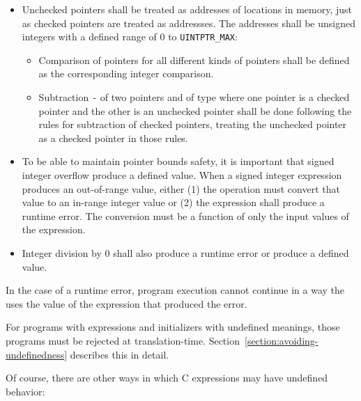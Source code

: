 \begin{itemize}
\item
  Unchecked pointers shall be treated as addresses of locations in memory,
  just as checked pointers are treated as addressses. The addresses shall
  be unsigned integers with a defined range of 0 to
  \texttt{UINTPTR\_MAX}:

  \begin{itemize}
  \item
    Comparison of pointers for all different kinds of pointers shall be
    defined as the corresponding integer comparison.
  \item
    Subtraction  \texttt{-}  of two pointers  and 
    of type  where one
    pointer is a checked pointer and the other is an unchecked pointer shall
    be done following the rules for subtraction of checked pointers,
    treating the unchecked pointer as a checked pointer in those rules.
  \end{itemize}
\end{itemize}

\begin{itemize}
\item
  To be able to maintain pointer bounds safety, it is important that
  signed integer overflow produce a defined value. When a signed integer
  expression produces an out-of-range value, either (1) the operation
  must convert that value to an in-range integer value or (2) the
  expression shall produce a runtime error. The conversion must be a
  function of only the input values of the expression.
\item
  Integer division by 0 shall also produce a runtime error or produce a
  defined value.
\end{itemize}

In the case of a runtime error, program execution cannot continue in a
way the uses the value of the expression that produced the error.

For programs with expressions and initializers with undefined meanings,
those programs must be rejected at translation-time. 
Section~\ref{section:avoiding-undefinedness}
describes this in detail.

Of course, there are other ways in which C expressions may have
undefined behavior:

